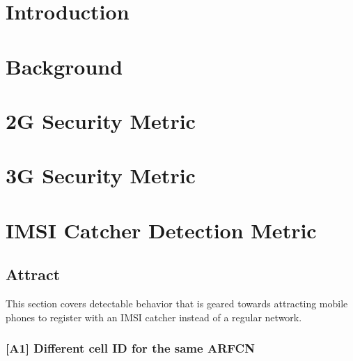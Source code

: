 \documentclass[a4paper,11pt,notitlepage,bigheadings,oneside]{scrartcl}
\begin{document}
\newcommand{\TBD}{{\color{srldark}\textbf{TBD}}}
\newcommand{\FIXME}[1]{{\color{srldark}\textit{TODO: #1}}}

\maketitle
\pagebreak

\tableofcontents
\pagebreak

\section{Introduction}
\label{sec:introduction}

\section{Background}
\label{sec:background}



\section{2G Security Metric}
\label{sec:2g_security_metric}

\section{3G Security Metric}
\label{sec:3g_security_metric}

\section{IMSI Catcher Detection Metric}
\label{sec:imsi_catcher_detection_metric}

\subsection{Attract}

This section covers detectable behavior that is geared towards attracting
mobile phones to register with an IMSI catcher instead of a regular network.

\subsubsection{[A1] Different cell ID for the same ARFCN}
\end{document}
